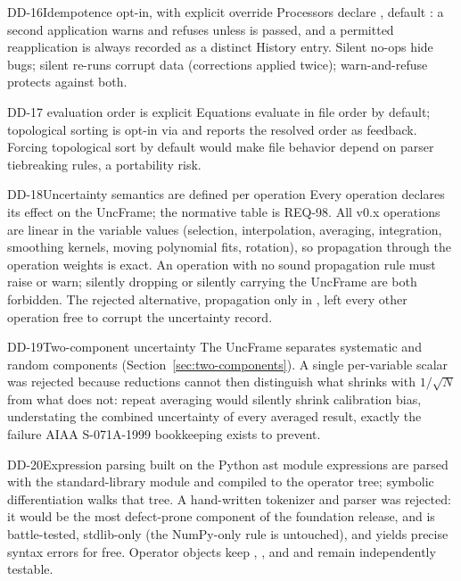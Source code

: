 \begin{ddbox}{DD-16}{Idempotence opt-in, with explicit override}
Processors declare , default : a second
application warns and refuses unless  is passed, and a
permitted reapplication is always recorded as a distinct History entry.
Silent no-ops hide bugs; silent re-runs corrupt data (corrections applied
twice); warn-and-refuse protects against both.
\end{ddbox}

\begin{ddbox}{DD-17}{ evaluation order is explicit}
Equations evaluate in file order by default; topological sorting is
opt-in via  and reports the resolved order as
feedback. Forcing topological sort by default would make file behavior
depend on parser tiebreaking rules, a portability risk.
\end{ddbox}

\begin{ddbox}{DD-18}{Uncertainty semantics are defined per operation}
Every operation declares its effect on the UncFrame; the normative table
is REQ-98. All v0.x operations are linear in the variable values
(selection, interpolation, averaging, integration, smoothing kernels,
moving polynomial fits, rotation), so propagation through the operation
weights is exact. An operation with no sound propagation rule must raise
or warn; silently dropping or silently carrying the UncFrame are both
forbidden. The rejected alternative, propagation only in ,
left every other operation free to corrupt the uncertainty record.
\end{ddbox}

\begin{ddbox}{DD-19}{Two-component uncertainty}
The UncFrame separates systematic and random components
(Section~\ref{sec:two-components}). A single per-variable scalar was
rejected because reductions cannot then distinguish what shrinks with
$1/\sqrt{N}$ from what does not: repeat averaging would silently shrink
calibration bias, understating the combined uncertainty of every averaged
result, exactly the failure AIAA S-071A-1999 bookkeeping exists to
prevent.
\end{ddbox}

\begin{ddbox}{DD-20}{Expression parsing built on the Python ast module}
 expressions are parsed with the standard-library
 module and compiled to the \itc{} operator tree; symbolic
differentiation walks that tree. A hand-written tokenizer and parser was
rejected: it would be the most defect-prone component of the foundation
release, and  is battle-tested, stdlib-only (the NumPy-only rule
is untouched), and yields precise syntax errors for free. Operator objects
keep , , and  and remain
independently testable.
\end{ddbox}

